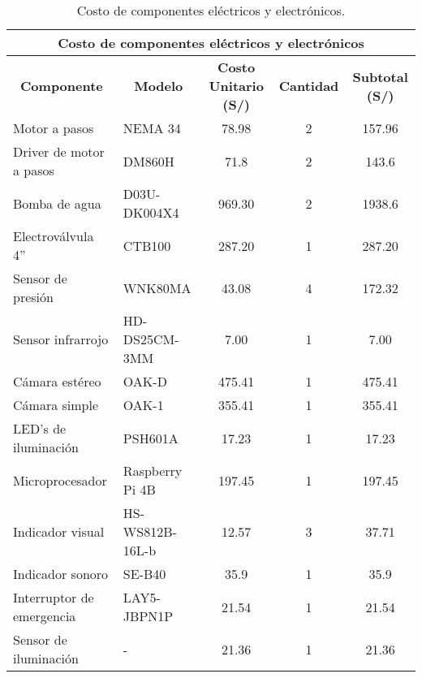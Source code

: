 \begin{table}[H]
	\footnotesize\centering
	\caption{Costo de componentes eléctricos y electrónicos.}
	\label{tab:costo de componentes electricos y electronicos}
	\begin{tabular}{llc|c|c|}
		\hline
		\multicolumn{5}{|c|}{\textbf{Costo de componentes eléctricos y electrónicos}} \\ \hline
		\multicolumn{1}{|c|}{\textbf{Componente}} & \multicolumn{1}{c|}{\textbf{Modelo}} & \multicolumn{1}{c|}{\textbf{Costo Unitario (S/)}} & \multicolumn{1}{c|}{\textbf{Cantidad}} & \multicolumn{1}{c|}{\textbf{Subtotal (S/)}} \\ \hline
		\multicolumn{1}{|l|}{Motor a pasos}  & \multicolumn{1}{l|}{NEMA 34} & 78.98 & 2 & 157.96 \\ \hline
		\multicolumn{1}{|l|}{Driver de motor a pasos}  & \multicolumn{1}{l|}{DM860H} & 71.8 & 2 & 143.6 \\ \hline
		\multicolumn{1}{|l|}{Bomba de agua} & \multicolumn{1}{l|}{D03U-DK004X4} & 969.30 & 2 & 1938.6 \\ \hline
		\multicolumn{1}{|l|}{Electroválvula 4''} & \multicolumn{1}{l|}{CTB100} & 287.20 & 1 & 287.20 \\ \hline
		\multicolumn{1}{|l|}{Sensor de presión}  & \multicolumn{1}{l|}{WNK80MA} & 43.08 & 4 & 172.32 \\ \hline
		\multicolumn{1}{|l|}{Sensor infrarrojo}  & \multicolumn{1}{l|}{HD-DS25CM-3MM} & 7.00 & 1 & 7.00 \\ \hline
		\multicolumn{1}{|l|}{Cámara estéreo}  & \multicolumn{1}{l|}{OAK-D} & 475.41 & 1 & 475.41 \\ \hline
		\multicolumn{1}{|l|}{Cámara simple}  & \multicolumn{1}{l|}{OAK-1}& 355.41 & 1 & 355.41 \\ \hline
		\multicolumn{1}{|l|}{LED's de iluminación}  & \multicolumn{1}{l|}{PSH601A} & 17.23 & 1 & 17.23 \\ \hline
		\multicolumn{1}{|l|}{Microprocesador}   & \multicolumn{1}{l|}{Raspberry Pi 4B} & 197.45 & 1 & 197.45 \\ \hline
		\multicolumn{1}{|l|}{Indicador visual}  & \multicolumn{1}{l|}{HS-WS812B-16L-b} & 12.57 & 3 & 37.71 \\ \hline
		\multicolumn{1}{|l|}{Indicador sonoro}  & \multicolumn{1}{l|}{SE-B40} & 35.9 & 1 & 35.9 \\ \hline
		\multicolumn{1}{|l|}{Interruptor de emergencia}  & \multicolumn{1}{l|}{LAY5-JBPN1P} & 21.54 & 1 & 21.54 \\ \hline
		\multicolumn{1}{|l|}{Sensor de iluminación}  & \multicolumn{1}{l|}{-} & 21.36 & 1 & 21.36 \\ \hline

\end{tabular}
\end{table}

